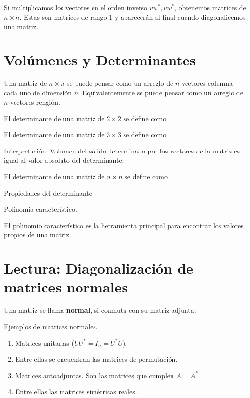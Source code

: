Si multiplicamos los vectores en el orden inverso $vw^*, vw^*$, obtenemos matrices de $n\times n$. Estas son matrices de rango $1$ y aparecerán al final cuando diagonalicemos una matriz.

\section{Volúmenes y Determinantes}

Una matriz de $n\times n$ se puede pensar como un arreglo de $n$ vectores columna cada uno de dimensión $n$. Equivalentemente se puede pensar como un arreglo de $n$ vectores renglón.

\begin{definicion}
El determinante de una matriz de $2\times 2$ se define como
\vspace{2cm}

El determinante de una matriz de $3\times 3$ se define como
\vspace{3cm}
\end{definicion}

Interpretación: Volúmen del sólido determinado por los vectores de la matriz es igual al valor absoluto del determinante.

\begin{definicion}
El determinante de una matriz de $n\times n$ se define como
\vspace{4cm}
\end{definicion}

Propiedades del determinante
\vspace{4cm}

\newpage

\begin{definicion}
Polinomio característico.
\end{definicion}

El polinomio característico es la herramienta principal para encontrar los valores propios de una matriz.


\section{Lectura: Diagonalización de matrices normales}

Una matriz se llama {\bf normal}, si conmuta con su matriz adjunta:

Ejemplos de matrices normales.
\begin{enumerate}
    \item Matrices unitarias ($UU^*=I_n=U^*U$). 
    \item Entre ellas se encuentran las matrices de permutación.
    \item Matrices autoadjuntas. Son las matrices que cumplen $A=A^*$.
    \item Entre ellas las matrices simétricas reales.
\end{enumerate}


